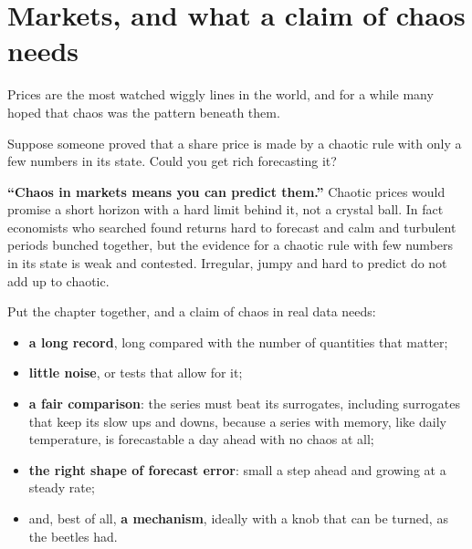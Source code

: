 \section{Markets, and what a claim of chaos needs}
\label{sec:ch15-evidence}

\noindent
Prices are the most watched wiggly lines in the world, and for a while many
hoped that chaos was the pattern beneath them.

\begin{think}
Suppose someone proved that a share price is made by a chaotic rule with only
a few numbers in its state. Could you get rich forecasting it?
\end{think}

\begin{trapbox}
\textbf{\enquote{Chaos in markets means you can predict them.}} Chaotic
prices would promise a short horizon with a hard limit behind it, not a
crystal ball. In fact economists who searched found returns hard to forecast
and calm and turbulent periods bunched together, but the evidence for a
chaotic rule with few numbers in its state is weak and contested.
Irregular, jumpy and hard to predict do not add up to chaotic.
\end{trapbox}

\noindent
Put the chapter together, and a claim of chaos in real data needs:

\begin{itemize}
\item \textbf{a long record}, long compared with the number of quantities
  that matter;
\item \textbf{little noise}, or tests that allow for it;
\item \textbf{a fair comparison}: the series must beat its surrogates,
  including surrogates that keep its slow ups and downs, because a series
  with memory, like daily temperature, is forecastable a day ahead with no
  chaos at all;
\item \textbf{the right shape of forecast error}: small a step ahead and
  growing at a steady rate;
\item and, best of all, \textbf{a mechanism}, ideally with a knob that can
  be turned, as the beetles had.
\end{itemize}

